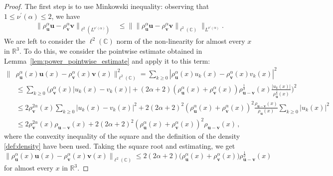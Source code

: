 \documentclass[12pt,a4paper]{amsart}
\numberwithin{equation}{section}
\newcommand{\ulu}{\boldsymbol{u}}
\newcommand{\ulv}{\boldsymbol{v}}
\begin{document}
	\begin{proof}
		The first step is to use Minkowski inequality: observing that $ 1\le\nu^\prime(\alpha)\le2 $, we have
		\begin{align}
			\big\| \rho_{\ulu}^\alpha \ulu - \rho_{\ulv}^\alpha \ulv  \big\|_{\ell^2(L^{\nu^\prime(\alpha)})} %
			& \leq \big\| \| \rho_{\ulu}^\alpha \ulu - \rho_{\ulv}^\alpha \ulv \|_{\ell^2(\mathbb{C})} \big\|_{L^{\nu^\prime(\alpha)}} . \label{eq:Minkowski}
		\end{align}
		We are left to consider the $ \ell^2(\mathbb{C}) $ norm of the non-linearity for almost every $ x $ in $\mathbb{R}^3 $. To do this, we consider the pointwise estimate obtained in Lemma~\ref{lem:power_pointwise_estimate} and apply it to this term:
		\begin{align*}
			\| & \rho_{\ulu}^\alpha (x) \ulu (x) -  \rho_{\ulv}^\alpha (x) \ulv (x) \|_{\ell^2(\mathbb{C})}^2 = \sum_{k \geq 0}  | \rho_{\ulu}^\alpha (x) u_k (x) - \rho_{\ulv}^\alpha (x) v_k (x) |^2  \\
			&\leq  \sum_{k \geq 0}  \big( \rho_{{\ulv}}^\alpha (x) | u_k(x) - v_k(x) | + (2\alpha+2) ( \rho_{{\ulu}}^\alpha (x) + \rho_{{\ulv}}^\alpha (x) ) \rho_{{\ulu}-{\ulv}}^{\frac{1}{2}} (x) \frac{|u_k(x)|}{\rho_{{\ulu}}^{\frac{1}{2}}(x)} \big)^2 \\
			&\leq  2 \rho_{{\ulv}}^{2\alpha} (x) \sum_{k \geq 0}  | u_k(x) - v_k(x) |^2 + 2 (2\alpha+2)^2 ( \rho_{{\ulu}}^\alpha (x) + \rho_{{\ulv}}^\alpha (x) )^2 \frac{ \rho_{{\ulu}-{\ulv}} (x)}{\rho_{{\ulu}}(x)} \sum_{k \geq 0}  |u_k(x)|^2  \\
			&\leq  2 \rho_{{\ulv}}^{2\alpha} (x) \rho_{{\ulu}-{\ulv}}(x) +2 (2\alpha+2)^2 ( \rho_{{\ulu}}^\alpha (x) + \rho_{{\ulv}}^\alpha (x) )^2\rho_{{\ulu}-{\ulv}} (x)  \,,
		\end{align*}
		where the convexity inequality of the square and the definition of the density \eqref{def:density} have been used. Taking the square root and estimating, we get
		\begin{equation*}
			\| \rho_{\ulu}^\alpha (x) \ulu (x) - \rho_{\ulv}^\alpha (x) \ulv (x) \|_{\ell^2(\mathbb{C})} \leq 2(2\alpha+2)  \big( \rho_{{\ulu}}^\alpha (x) + \rho_{{\ulv}}^\alpha (x) \big) \rho_{{\ulu}-{\ulv}}^{\frac{1}{2}} (x) 
		\end{equation*}
		for almost every $ x$ in $\mathbb{R}^3 $.
		

\end{proof}
\end{document}
